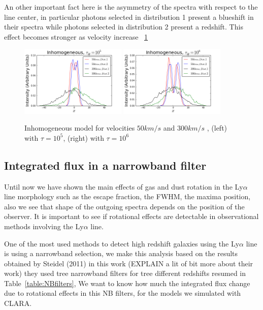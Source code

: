 \documentclass[usenatbib]{mn2e}
\begin{document}
An other important fact here is the asymmetry of the spectra with respect 
to the line center, in particular photons selected in distribution 1 
present a blueshift in their spectra while photons selected in distribution 
2 present a redshift. This effect becomes stronger as velocity increase 
~\ref{figure:inhomogeneous}
 
\begin{figure}
  \includegraphics[width=0.45\textwidth]{InomogeneousModelt5.png}
  \includegraphics[width=0.45\textwidth]{InomogeneousModelt6.png}
 \caption{Inhomogeneous model for velocities $50km/s$ and $300km/s$ ,
   (left) with $\tau=10^5$, (right) with
   $\tau=10^6$\label{figure:inhomogeneous}}  
\end{figure}
 

\subsection{Integrated flux in a narrowband filter}

Until now we have shown the main effects of gas and dust rotation in
the Ly$\alpha$ line morphology such as the escape fraction, the FWHM,
the maxima position, also we see that shape of the outgoing spectra
depends on the position of the observer. It is important to see if
rotational effects are detectable in observational methods involving
the Ly$\alpha$ line.  

One of the most used methods to detect high redshift galaxies using
the Ly$\alpha$ line is using a narrowband selection, we make this
analysis based on the results obtained by Steidel (2011) in this work
(EXPLAIN a lit of bit more about their work) they used tree narrowband
filters for tree different redshifts resumed in
Table~\ref{table:NBfilters}, We want to know how much the integrated
flux change due to rotational effects in this NB filters, for the
models we simulated with CLARA. 
\end{document}
